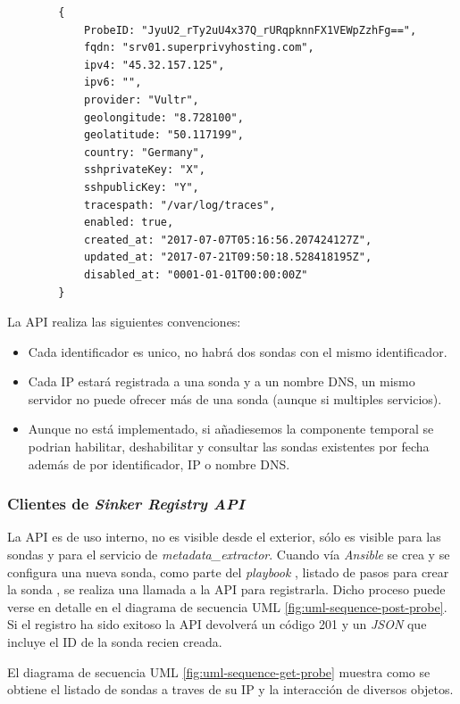     \begin{verbatim}
        {
            ProbeID: "JyuU2_rTy2uU4x37Q_rURqpknnFX1VEWpZzhFg==",
            fqdn: "srv01.superprivyhosting.com",
            ipv4: "45.32.157.125",
            ipv6: "",
            provider: "Vultr",
            geolongitude: "8.728100",
            geolatitude: "50.117199",
            country: "Germany",
            sshprivateKey: "X",
            sshpublicKey: "Y",
            tracespath: "/var/log/traces",
            enabled: true,
            created_at: "2017-07-07T05:16:56.207424127Z",
            updated_at: "2017-07-21T09:50:18.528418195Z",
            disabled_at: "0001-01-01T00:00:00Z"
        }
    \end{verbatim}

La API realiza las siguientes convenciones:

\begin{itemize}
    \item Cada identificador es unico, no habrá dos sondas con el mismo identificador.
    \item Cada IP estará registrada a una sonda y a un nombre DNS, un mismo servidor no puede ofrecer más de una sonda (aunque si multiples servicios).
    \item Aunque no está implementado, si añadiesemos la componente temporal se podrian habilitar, deshabilitar y consultar las sondas existentes por fecha además
    de por identificador, IP o nombre DNS.
\end{itemize}

\subsubsection{Clientes de \emph{Sinker Registry API}}

La API es de uso interno, no es visible desde el exterior, sólo es visible para las sondas y para el servicio de \emph{metadata\_extractor}.
Cuando vía \emph{Ansible} se crea y se configura una nueva sonda, como parte del \emph{playbook} , listado de pasos para crear la sonda , se
realiza una llamada a la API para registrarla. Dicho proceso puede verse en detalle en el diagrama de secuencia UML \ref{fig:uml-sequence-post-probe}.
Si el registro ha sido exitoso la API devolverá un código 201 y un \emph{JSON} que incluye el ID de la sonda recien creada.

El diagrama de secuencia UML \ref{fig:uml-sequence-get-probe} muestra como se obtiene el listado de sondas a traves de su IP y la interacción
de diversos objetos.

